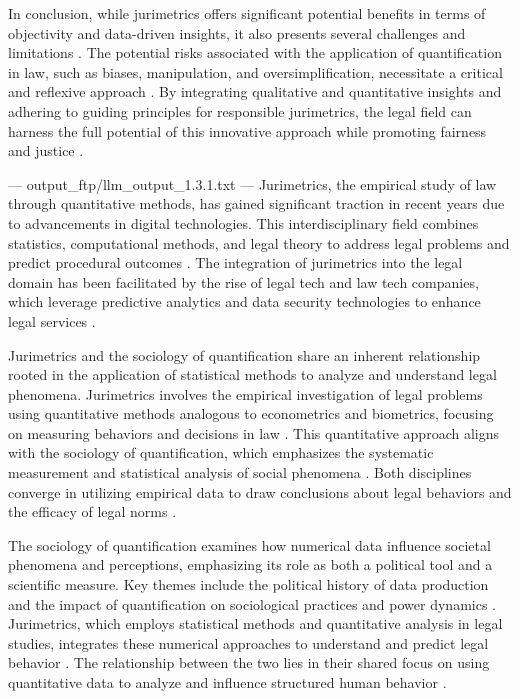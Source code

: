 In conclusion, while jurimetrics offers significant potential benefits in terms of objectivity and data-driven insights, it also presents several challenges and limitations \cite{10.1007/s11186-021-09453-1,demortain2019politics}. The potential risks associated with the application of quantification in law, such as biases, manipulation, and oversimplification, necessitate a critical and reflexive approach \cite{10.1007/s11186-021-09453-1,demortain2019politics}. By integrating qualitative and quantitative insights and adhering to guiding principles for responsible jurimetrics, the legal field can harness the full potential of this innovative approach while promoting fairness and justice \cite{10.1007/s11186-021-09453-1,demortain2019politics}.


---
output_ftp/llm_output_1.3.1.txt
---
Jurimetrics, the empirical study of law through quantitative methods, has gained significant traction in recent years due to advancements in digital technologies. This interdisciplinary field combines statistics, computational methods, and legal theory to address legal problems and predict procedural outcomes \cite{silva2023role,103390fi9040068}. The integration of jurimetrics into the legal domain has been facilitated by the rise of legal tech and law tech companies, which leverage predictive analytics and data security technologies to enhance legal services \cite{silva2023role}.

Jurimetrics and the sociology of quantification share an inherent relationship rooted in the application of statistical methods to analyze and understand legal phenomena. Jurimetrics involves the empirical investigation of legal problems using quantitative methods analogous to econometrics and biometrics, focusing on measuring behaviors and decisions in law \cite{nunes2016,zabala1809}. This quantitative approach aligns with the sociology of quantification, which emphasizes the systematic measurement and statistical analysis of social phenomena \cite{nunes2016}. Both disciplines converge in utilizing empirical data to draw conclusions about legal behaviors and the efficacy of legal norms \cite{luvizotto2020,maia2039,nunes2016}.

The sociology of quantification examines how numerical data influence societal phenomena and perceptions, emphasizing its role as both a political tool and a scientific measure. Key themes include the political history of data production and the impact of quantification on sociological practices and power dynamics \cite{paiva2021,camargo2021,saltelli2020}. Jurimetrics, which employs statistical methods and quantitative analysis in legal studies, integrates these numerical approaches to understand and predict legal behavior \cite{de2010,nunes2016}. The relationship between the two lies in their shared focus on using quantitative data to analyze and influence structured human behavior \cite{nunes2016,luvizotto2020}.

